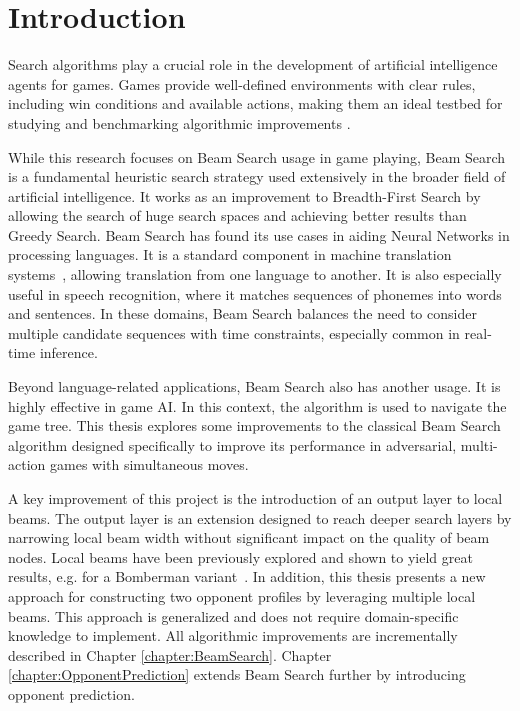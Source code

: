\documentclass[shortabstract, mgr, english]{iithesis}
\author         {Marcin Wróbel}
\date          {17.02.2026r.}                     %
\begin{document}

\chapter{Introduction}
Search algorithms play a crucial role in the development of artificial intelligence agents for games.
Games provide well-defined environments with clear rules, including win conditions and available actions, making them an ideal testbed for studying and benchmarking algorithmic improvements \cite{Campbell2002Deep,silver2017mastering}.

While this research focuses on Beam Search usage in game playing, Beam Search is a fundamental heuristic search strategy used extensively in the broader field of artificial intelligence. It works as an improvement to Breadth-First Search by allowing the search of huge search spaces and achieving better results than Greedy Search. Beam Search has found its use cases in aiding Neural Networks in processing languages. It is a standard component in machine translation systems~\cite{sutskever2014sequence}, allowing translation from one language to another. It is also especially useful in speech recognition, where it matches sequences of phonemes into words and sentences. In these domains, Beam Search balances the need to consider multiple candidate sequences with time constraints, especially common in real-time inference.

Beyond language-related applications, Beam Search also has another usage. It is highly effective in game AI. In this context, the algorithm is used to navigate the game tree. This thesis explores some improvements to the classical Beam Search algorithm designed specifically to improve its performance in adversarial, multi-action games with simultaneous moves.

A key improvement of this project is the introduction of an output layer to local beams. The output layer is an extension designed to reach deeper search layers by narrowing local beam width without significant impact on the quality of beam nodes. Local beams have been previously explored and shown to yield great results, e.g. for a Bomberman variant~\cite{kowalczyk2022developing}. In addition, this thesis presents a new approach for constructing two opponent profiles by leveraging multiple local beams. This approach is generalized and does not require domain-specific knowledge to implement. All algorithmic improvements are incrementally described in Chapter \ref{chapter:BeamSearch}. Chapter \ref{chapter:OpponentPrediction} extends Beam Search further by introducing opponent prediction.
\end{document}
